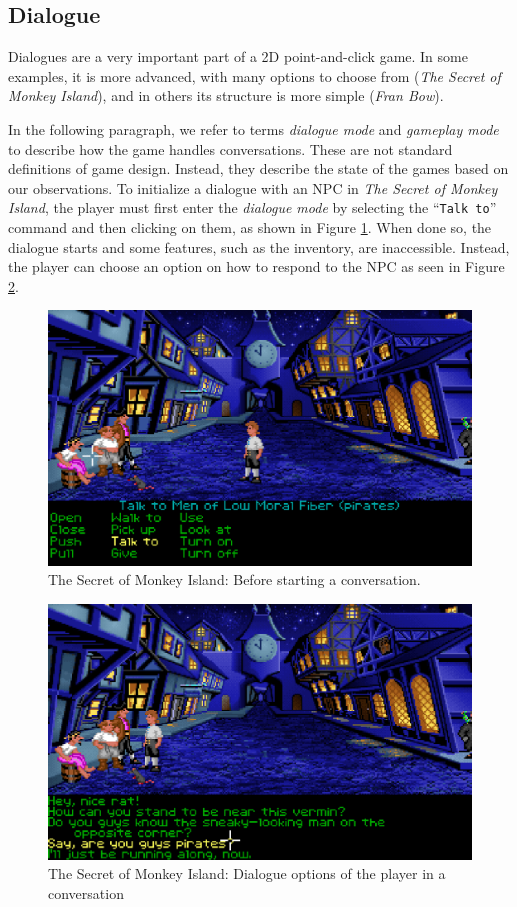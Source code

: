 \subsection{Dialogue}
\label{sec:Dialogue}
Dialogues are a very important part of a 2D point-and-click game. In some examples, it is more advanced, with many options to choose from (\textit{The Secret of Monkey Island}), and in others its structure is more simple (\textit{Fran Bow}).  

In the following paragraph, we refer to terms \textit{dialogue mode} and \textit{gameplay mode} to describe how the game handles conversations. These are not standard definitions of game design. Instead, they describe the state of the games based on our observations. To initialize a dialogue with an NPC in \textit{The Secret of Monkey Island}, the player must first enter the \textit{dialogue mode} by selecting the “\texttt{Talk to}” command and then clicking on them, as shown in Figure \ref{fig:D-TSoMI0}. When done so, the dialogue starts and some features, such as the inventory, are inaccessible. Instead, the player can choose an option on how to respond to the NPC as seen in Figure \ref{fig:D-TSoMI1}. 

\begin{figure}[H]
\centering
\includegraphics[width=.8\linewidth]{img/D-TSoMI0.png}
\caption{The Secret of Monkey Island: Before starting a conversation.}
\label{fig:D-TSoMI0}
\end{figure}

\begin{figure}[H]
\centering
\includegraphics[width=.8\linewidth]{img/D-TSoMI1.png}
\caption{The Secret of Monkey Island: Dialogue options of the player in a conversation}
\label{fig:D-TSoMI1}
\end{figure}

